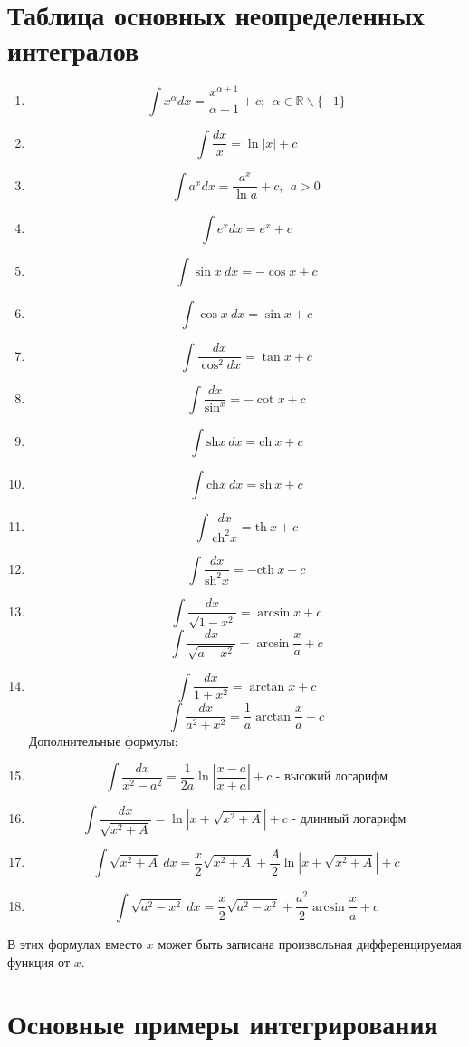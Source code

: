 \documentclass[a4paper,12pt]{bookest}
\theoremstyle{remark}
\begin{document}
\section{Таблица основных неопределенных интегралов}
\begin{enumerate}
	\item $$\int x^\alpha dx=\frac{x^{\alpha+1}}{\alpha+1}+c;\>\>\alpha\in\mathbb{R}\backslash\{-1\}$$
	\item $$\int\frac{dx}{x}=\ln|x|+c$$
	\item $$\int a^xdx=\frac{a^x}{\ln a}+c,\>\>a>0$$
	\item $$\int e^xdx=e^x+c$$
	\item $$\int\sin x\>dx	=-\cos x+c$$
	\item $$\int\cos x\>dx=\sin x+c$$
	\item $$\int\frac{dx}{\cos^2dx}=\tan x+c$$
	\item $$\int\frac{dx}{\sin^x}=-\cot x+c$$
	\item $$\int\textrm{sh}x\>dx=\textrm{ch}\>x+c$$
	\item $$\int\textrm{ch}x\>dx=\textrm{sh}\>x+c$$
	\item $$\int\frac{dx}{\textrm{ch}^2x}=\textrm{th}\>x+c$$
	\item $$\int\frac{dx}{\textrm{sh}^2x}=-\textrm{cth}\>x+c$$
	\item $$\int\frac{dx}{\sqrt{1-x^2}}=\arcsin x+c$$
		$$\int\frac{dx}{\sqrt{a-x^2}}=\arcsin \frac{x}{a}+c$$
	\item $$\int\frac{dx}{1+x^2}=\arctan x+c$$
		$$\int\frac{dx}{a^2+x^2}=\frac{1}{a}\arctan\frac{x}{a}+c$$
		Дополнительные формулы: 
	\item $$\int\frac{dx}{x^2-a^2}=\frac{1}{2a}\ln|\frac{x-a}{x+a}|+c\textrm{ - высокий логарифм}$$ 
	\item $$\int\frac{dx}{\sqrt{x^2+A}}=\ln|x+\sqrt{x^2+A}|+c\textrm{ - длинный логарифм }$$
	\item $$\int\sqrt{x^2+A}\>dx=\frac{x}{2}\sqrt{x^2+A}+\frac{A}{2}\ln|x+\sqrt{x^2+A}|+c$$
	\item $$\int\sqrt{a^2-x^2}\>dx=\frac{x}{2}\sqrt{a^2-x^2}+\frac{a^2}{2}\arcsin\frac{x}{a}+c$$
\end{enumerate}
В этих формулах вместо $x$ может быть записана произвольная дифференцируемая функция от $x$.
\section{Основные примеры интегрирования}
\end{document}
